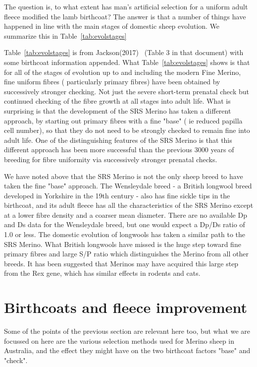 \documentclass[titlepage]{article}  %
\begin{document}
The question is, to what extent has man's artificial selection for a uniform adult fleece modified the lamb birthcoat? The answer is that a number of things have happened in line with the main stages of domestic sheep evolution. We summarize this in Table~\ref{tab:evolstages}

Table~\ref{tab:evolstages} is from Jackson(2017)~\cite{jack:17} (Table 3 in that document) with some birthcoat information appended. What Table~\ref{tab:evolstages} shows is that for all of the stages of evolution up to and including the modern Fine Merino, fine uniform fibres ( particularly primary fibres) have been obtained by successively stronger checking. Not just the severe short-term prenatal check but continued checking of the fibre growth at all stages into adult life. What is surprising is that the development of the SRS Merino has taken a different approach, by starting out primary fibres with a fine "base" ( ie reduced papilla cell number), so that they do not need to be strongly checked to remain fine into adult life. One of the distinguishing features of the SRS Merino is that this different approach has been more successful than the previous 3000 years of breeding for fibre uniformity via successively stronger prenatal checks.

We have noted above that the SRS Merino is not the only sheep breed to have taken the fine "base" approach. The Wensleydale breed - a British longwool breed developed in Yorkshire in the 19th century - also has fine sickle tips in the birthcoat, and its adult fleece has all the characteristics of the SRS Merino except at a lower fibre density and a coarser mean diameter. There are no available Dp and Ds data for the Wensleydale breed, but one would expect a Dp/Ds ratio of 1.0 or less. The domestic evolution of longwools has taken a similar path to the SRS Merino. What British longwools have missed is the huge step toward fine primary fibres and large S/P ratio which distinguishes the Merino from all other breeds.  It has been suggested that Merinos may have acquired this large step from the Rex gene, which has similar effects in rodents and cats.

\section{Birthcoats and fleece improvement}
Some of the points of the previous section are relevant here too, but what we are focussed on here are the various selection methods used for Merino sheep in Australia, and  the effect they might have on the two birthcoat factors "base" and "check". 
\end{document}
